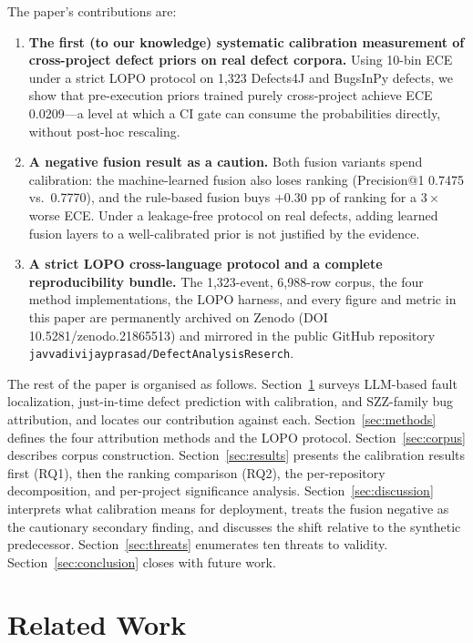 \documentclass[preprint,12pt]{elsarticle}
\begin{document}
The paper's contributions are:
\begin{enumerate}
\item \textbf{The first (to our knowledge) systematic calibration measurement of cross-project defect priors on real defect corpora.} Using 10-bin ECE under a strict LOPO protocol on 1{,}323 Defects4J and BugsInPy defects, we show that pre-execution priors trained purely cross-project achieve ECE 0.0209---a level at which a CI gate can consume the probabilities directly, without post-hoc rescaling.
\item \textbf{A negative fusion result as a caution.} Both fusion variants spend calibration: the machine-learned fusion also loses ranking (Precision@1 0.7475 vs.\ 0.7770), and the rule-based fusion buys $+0.30$ pp of ranking for a $3\times$ worse ECE. Under a leakage-free protocol on real defects, adding learned fusion layers to a well-calibrated prior is not justified by the evidence.
\item \textbf{A strict LOPO cross-language protocol and a complete reproducibility bundle.} The 1{,}323-event, 6{,}988-row corpus, the four method implementations, the LOPO harness, and every figure and metric in this paper are permanently archived on Zenodo (DOI 10.5281/zenodo.21865513) and mirrored in the public GitHub repository \texttt{javvadivijayprasad/DefectAnalysisReserch}.
\end{enumerate}

The rest of the paper is organised as follows. Section~\ref{sec:related} surveys LLM-based fault localization, just-in-time defect prediction with calibration, and SZZ-family bug attribution, and locates our contribution against each. Section~\ref{sec:methods} defines the four attribution methods and the LOPO protocol. Section~\ref{sec:corpus} describes corpus construction. Section~\ref{sec:results} presents the calibration results first (RQ1), then the ranking comparison (RQ2), the per-repository decomposition, and per-project significance analysis. Section~\ref{sec:discussion} interprets what calibration means for deployment, treats the fusion negative as the cautionary secondary finding, and discusses the shift relative to the synthetic predecessor. Section~\ref{sec:threats} enumerates ten threats to validity. Section~\ref{sec:conclusion} closes with future work.

\section{Related Work}
\label{sec:related}
\end{document}

